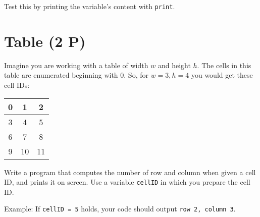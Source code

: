 \documentclass[
	english,
	fontsize=10pt,
	parskip=half,
	titlepage=true,
	DIV=12
]{scrartcl}
\newcommand*{\tabcrlf}{\\ \hline}
\newcommand*{\inPy}[1]{\texttt{#1}}
\begin{document}
Test this by printing the variable's content with \inPy{print}.

\section{Table (2 P)}
Imagine you are working with a table of width $w$ and height $h$. The cells in this table are enumerated beginning with 0. So, for $w = 3, h = 4$ you would get these cell IDs:
\begin{center}
\begin{tabular}{|c|c|c|}
	\hline
	 0 &  1 &  2 \tabcrlf 
	 3 &  4 &  5 \tabcrlf
	 6 &  7 &  8 \tabcrlf
	 9 & 10 & 11 \tabcrlf
\end{tabular}
\end{center}

Write a program that computes the number of row and column when given a cell ID, and prints it on screen. Use a variable \texttt{cellID} in which you prepare the cell ID.

Example: If \inPy{cellID = 5} holds, your code should output \texttt{row 2, column 3}.
\end{document}
